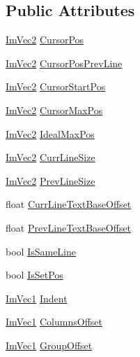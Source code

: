 \subsection*{Public Attributes}
\begin{DoxyCompactItemize}
\item 
\hyperlink{structImVec2}{Im\+Vec2} \hyperlink{structImGuiWindowTempData_aa76e59bf36a6b212c667dbb2706cdc54}{Cursor\+Pos}
\item 
\hyperlink{structImVec2}{Im\+Vec2} \hyperlink{structImGuiWindowTempData_add9d6659678ffce16d2b1653a8c15c35}{Cursor\+Pos\+Prev\+Line}
\item 
\hyperlink{structImVec2}{Im\+Vec2} \hyperlink{structImGuiWindowTempData_a4e5c2b786d40849ce195f670e2e4e78e}{Cursor\+Start\+Pos}
\item 
\hyperlink{structImVec2}{Im\+Vec2} \hyperlink{structImGuiWindowTempData_a2b8a133355700fe72f9c06d67e252d26}{Cursor\+Max\+Pos}
\item 
\hyperlink{structImVec2}{Im\+Vec2} \hyperlink{structImGuiWindowTempData_a100213bfaaee245df5c86539a2e7f538}{Ideal\+Max\+Pos}
\item 
\hyperlink{structImVec2}{Im\+Vec2} \hyperlink{structImGuiWindowTempData_a122b8e79d681562436251472d8e15ff4}{Curr\+Line\+Size}
\item 
\hyperlink{structImVec2}{Im\+Vec2} \hyperlink{structImGuiWindowTempData_aa8959576942c6611ce792490c5adc830}{Prev\+Line\+Size}
\item 
float \hyperlink{structImGuiWindowTempData_a36f5668cdb35d0da1957c12a6258daa9}{Curr\+Line\+Text\+Base\+Offset}
\item 
float \hyperlink{structImGuiWindowTempData_a56ea966c95f667c41f6ef2d6c0ad7aa2}{Prev\+Line\+Text\+Base\+Offset}
\item 
bool \hyperlink{structImGuiWindowTempData_adafbba60314dc97be8090332ac4eab21}{Is\+Same\+Line}
\item 
bool \hyperlink{structImGuiWindowTempData_a334efa30434ebba87b0c37c2872149b2}{Is\+Set\+Pos}
\item 
\hyperlink{structImVec1}{Im\+Vec1} \hyperlink{structImGuiWindowTempData_a1ed2e037a987c8fc7ecdc4f5888657b5}{Indent}
\item 
\hyperlink{structImVec1}{Im\+Vec1} \hyperlink{structImGuiWindowTempData_af86ba9662f7aeb95c49e785d941f4c69}{Columns\+Offset}
\item 
\hyperlink{structImVec1}{Im\+Vec1} \hyperlink{structImGuiWindowTempData_a29dbe26f59a7a8b667cc21a3ea3332a9}{Group\+Offset}
\item 

\end{DoxyCompactItemize}
